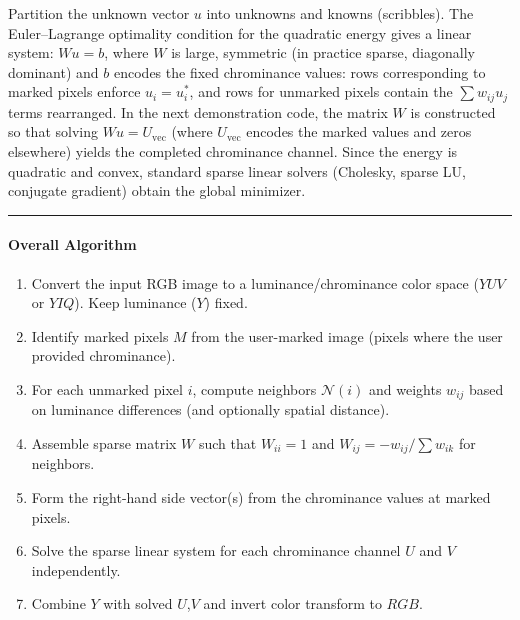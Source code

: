 \documentclass[11pt]{article}
\providecommand{\tightlist}{%
      \setlength{\itemsep}{0pt}\setlength{\parskip}{0pt}}
\begin{document}
Partition the unknown vector \(u\) into unknowns and knowns (scribbles).
The Euler--Lagrange optimality condition for the quadratic energy gives
a linear system: \(Wu = b\), where \(W\) is large, symmetric (in
practice sparse, diagonally dominant) and \(b\) encodes the fixed
chrominance values: rows corresponding to marked pixels enforce
\(u_i = u_i^*\), and rows for unmarked pixels contain the
\(\sum w_{ij} u_j\) terms rearranged. In the next demonstration code,
the matrix \(W\) is constructed so that solving \(W u = U_{\text{vec}}\)
(where \(U_{\text{vec}}\) encodes the marked values and zeros elsewhere)
yields the completed chrominance channel. Since the energy is quadratic
and convex, standard sparse linear solvers (Cholesky, sparse LU,
conjugate gradient) obtain the global minimizer.

\begin{center}\rule{0.5\linewidth}{0.5pt}\end{center}

\hypertarget{overall-algorithm}{%
\paragraph{\texorpdfstring{\textbf{Overall
Algorithm}}{Overall Algorithm}}\label{overall-algorithm}}

\begin{enumerate}
\def\labelenumi{\arabic{enumi}.}
\tightlist
\item
  Convert the input RGB image to a luminance/chrominance color space
  (\(YUV\) or \(YIQ\)). Keep luminance (\(Y\)) fixed.
\item
  Identify marked pixels \(M\) from the user-marked image (pixels where
  the user provided chrominance).
\item
  For each unmarked pixel \(i\), compute neighbors \(\mathcal{N}(i)\)
  and weights \(w_{ij}\) based on luminance differences (and optionally
  spatial distance).
\item
  Assemble sparse matrix \(W\) such that \(W_{ii}=1\) and
  \(W_{ij}=-w_{ij}/\sum w_{ik}\) for neighbors.
\item
  Form the right-hand side vector(s) from the chrominance values at
  marked pixels.
\item
  Solve the sparse linear system for each chrominance channel \(U\) and
  \(V\) independently.
\item
  Combine \(Y\) with solved \(U\),\(V\) and invert color transform to
  \(RGB\).
\end{enumerate}
\end{document}

